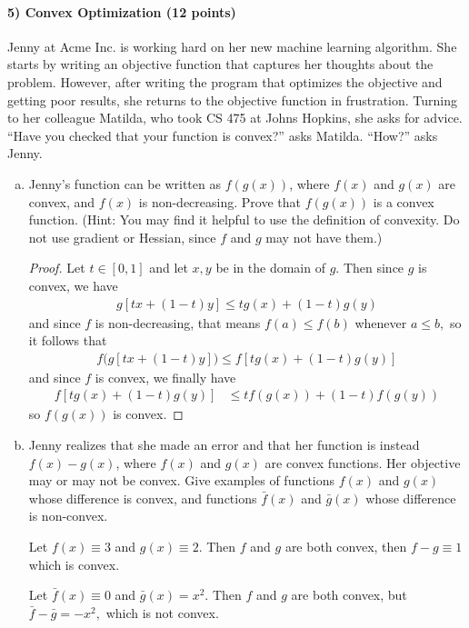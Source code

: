 \documentclass{article}
\begin{document}
\paragraph{5) Convex Optimization (12 points)}
Jenny at Acme Inc. is working hard on her new machine learning algorithm. She starts by writing an objective function
that captures her thoughts about the problem. However, after writing the program that optimizes the objective
and getting poor results, she returns to the objective function in frustration. Turning to her colleague Matilda,
who took CS 475 at Johns Hopkins, she asks for advice. ``Have you checked that your function is convex?'' asks Matilda.
``How?'' asks Jenny.
\begin{enumerate}[(a)]
	\item Jenny's function can be written as $f(g(x))$, where $f(x)$ and $g(x)$ are convex, and $f(x)$ is non-decreasing. Prove that $f(g(x))$ is a convex function. (Hint: You may find it helpful to use the definition of convexity. Do not use gradient or Hessian, since $f$ and $g$ may not have them.)
		\begin{proof}
			Let $t\in [0, 1]$ and let $x, y$ be in the domain of $g.$ Then since $g$ is convex, we have
			\begin{align*}
				g\left[ tx + (1-t)y \right] \le tg(x) + (1-t)g(y)
			\end{align*}
			and since $f$ is non-decreasing, that means $f(a)\le f(b)$ whenever $a\le b,$ so it follows that
			\begin{align*}
				f\big(g\left[ tx+(1-t)y \right]\big) \le f\left[ tg(x) + (1-t)g(y) \right]
			\end{align*}
			and since $f$ is convex, we finally have
			\begin{align*}
				f\left[ tg(x) + (1-t)g(y) \right] &\le t f(g(x)) + (1-t)f(g(y))
			\end{align*}
			so $f(g(x))$ is convex.
		\end{proof}
		
	\item Jenny realizes that she made an error and that her function is instead
		$f(x)-g(x)$, where $f(x)$ and $g(x)$ are convex functions. Her objective may or may not be convex. Give examples of functions $f(x)$ and $g(x)$ whose difference is convex, and functions $\bar{f}(x)$ and $\bar{g}(x)$ whose difference is non-convex.
		\begin{soln}
			Let $f(x)\equiv 3$ and $g(x)\equiv 2.$ Then $f$ and $g$ are both convex, then $f-g \equiv 1$ which is convex.

			Let $\bar f(x)\equiv0$ and $\bar g(x)=x^2.$ Then $f$ and $g$ are both convex, but $\bar f-\bar g=-x^2,$ which is not convex.		
		\end{soln}
\end{enumerate}
\end{document}
